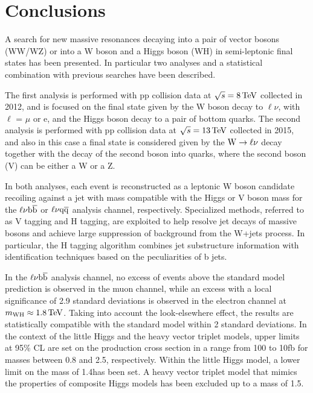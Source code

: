 \chapter{Conclusions}
\label{ch:summary1}

A search for new massive resonances decaying into a pair of vector bosons (WW/WZ) or into a W boson and a Higgs boson (WH)
in semi-leptonic final states has been presented. In particular two analyses and a statistical combination with previous searches have been described.

The first analysis is performed with pp collision data at $\sqrt{s} = 8\,\text{Te\hspace{-.08em}V}$ collected in 2012, and is focused on the final state given by the W boson decay to $\ell\nu$, with $\ell$ = $\mu$ or e,
and the Higgs boson decay to a pair of bottom quarks.
The second analysis is performed with pp collision data at $\sqrt{s} = 13\,\text{Te\hspace{-.08em}V}$ collected in 2015, and also in this case a final state is considered given by the $\mathrm{W}\to\ell\nu$ decay together with the decay of the second boson into quarks, where the second boson (V) can be either a W or a Z. 

In both analyses, each event is reconstructed as a leptonic W boson candidate recoiling against a jet with mass compatible with the Higgs or V boson mass for the $\ell\nu{\mathrm{b}\overline{\mathrm{b}}}$ or $\ell\nu\mathrm{q}\overline{\mathrm{q}}$ analysis channel, respectively.
Specialized methods, referred to as V tagging and H tagging, are exploited to help resolve jet decays of massive bosons and achieve large suppression of background from the W+jets process.
In particular, the H tagging algorithm combines jet substructure information with identification techniques based on the peculiarities of b jets.

In the $\ell\nu{\mathrm{b}\overline{\mathrm{b}}}$ analysis channel, no excess of events above the standard model prediction is observed in the muon channel,
while an excess with a local significance of 2.9 standard deviations is observed in the electron channel at $m_{\rm WH} \approx 1.8\,\text{Te\hspace{-.08em}V}$.
Taking into account the look-elsewhere effect, the results are statistically compatible with the standard model within 2 standard deviations.
In the context of the little Higgs and the heavy vector triplet models, upper limits at 95\% CL are set on the \Wpr production cross section
in a range from 100 to 10\unit{fb} for masses between 0.8 and 2.5\TeV, respectively.
Within the little Higgs model, a lower limit on the \Wpr mass of 1.4\TeV has been set.
A heavy vector triplet model that mimics the properties of composite Higgs models has been excluded up to a \Wpr mass of 1.5\TeV.

